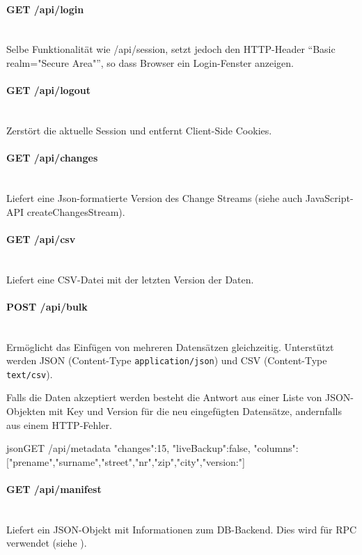 \paragraph{GET /api/login} ~\\
Selbe Funktionalität wie /api/session, setzt jedoch den HTTP-Header ``Basic realm="Secure Area"'', so dass Browser ein Login-Fenster anzeigen.

\paragraph{GET /api/logout} ~\\
Zerstört die aktuelle Session und entfernt Client-Side Cookies.

\paragraph{GET /api/changes} ~\\
Liefert eine Json-formatierte Version des Change Streams (siehe auch JavaScript-API createChangesStream).

\paragraph{GET /api/csv} ~\\
Liefert eine CSV-Datei mit der letzten Version der Daten.

\paragraph{POST /api/bulk} ~\\
Ermöglicht das Einfügen von mehreren Datensätzen gleichzeitig. Unterstützt werden JSON (Content-Type \texttt{application/json}) und CSV (Content-Type \texttt{text/csv}).

Falls die Daten akzeptiert werden besteht die Antwort aus einer Liste von JSON-Objekten mit Key und Version für die neu eingefügten Datensätze, andernfalls aus einem HTTP-Fehler.

\begin{srclst}{json}{GET /api/metadata}
{
    "changes":15, 
    "liveBackup":false, 
    "columns":["prename","surname","street","nr","zip","city","version:"]
}
\end{srclst}

\paragraph{GET /api/manifest} ~\\
Liefert ein JSON-Objekt mit Informationen zum DB-Backend. Dies wird für RPC verwendet (siehe ).


